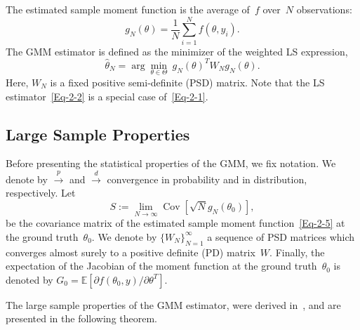 \documentclass{article}
\newcommand{\asaf}[1]{{\color{blue}{#1}}}
\newcommand{\E}[0]{\mathbb{E}}
\newcommand{\Cov}[0]{\operatorname{Cov}}
\begin{document}
\asaf{TODO: make it readable}

The estimated sample moment function is the average of~$f$ over~$N$ observations:
\begin{equation}\label{Eq-2-5}
	g_N(\theta) = \frac{1}{N} \sum_{i=1}^N f(\theta, y_i).
\end{equation}
The GMM estimator is defined as the minimizer of the weighted LS expression,
\begin{equation} \label{Eq-2-1}
	\hat{\theta}_N = \arg\min_{\theta \in \Theta} \ g_N(\theta)^T W_N g_N(\theta).
\end{equation}
Here, $W_N$ is a fixed positive semi-definite (PSD) matrix. Note that the LS estimator~\eqref{Eq-2-2} is a special case of~\eqref{Eq-2-1}.

\subsection{Large Sample Properties}\label{gmm:large}

Before presenting the statistical properties of the GMM, we fix notation. We denote by $\overset{p}{\to}$ and $\overset{d}{\to}$ convergence in  probability and in distribution, respectively. Let
\begin{equation} \label{eqn:cov_mat_S}
	S := \lim_{N\to \infty}\Cov\left[\sqrt{N}g_N(\theta_0)\right],
\end{equation}
be the covariance matrix of the estimated sample moment function~\eqref{Eq-2-5} at the ground truth~$\theta_0$. We denote by $\{W_N\}_{N=1}^\infty$ a sequence of PSD matrices which converges almost surely to a positive definite (PD) matrix~$W$. Finally, the expectation of the Jacobian of the moment function at the ground truth~$\theta_0$ is denoted by $G_0 = \E\left[\partial f(\theta_0, y) / \partial \theta^T\right]$.


The large sample properties of the GMM estimator, were derived in~\cite{Hansen1982}, and are presented in the following theorem.
\end{document}
